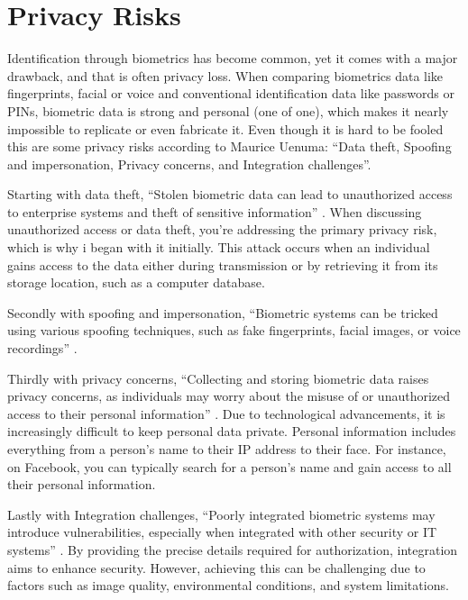 \documentclass[conference]{IEEEtran}
\begin{document}
\section{Privacy Risks}

Identification through biometrics has become common, yet it comes with a major drawback, and that is often privacy loss. When comparing biometrics data like fingerprints, facial or voice and conventional identification data like passwords or PINs, biometric data is strong and personal (one of one), which makes it nearly impossible to replicate or even fabricate it. Even though it is hard to be fooled this are some privacy risks according to Maurice Uenuma: ``Data theft, Spoofing and impersonation, Privacy concerns, and Integration challenges''. \cite{darkreading2024}

Starting with data theft, ``Stolen biometric data can lead to unauthorized access to enterprise systems and theft of sensitive information'' \cite{darkreading2024}. When discussing unauthorized access or data theft, you're addressing the primary privacy risk, which is why i began with it initially. This attack occurs when an individual gains access to the data either during transmission or by retrieving it from its storage location, such as a computer database.

Secondly with spoofing and impersonation, ``Biometric systems can be tricked using various spoofing techniques, such as fake fingerprints, facial images, or voice recordings'' \cite{darkreading2024}.

Thirdly with privacy concerns, ``Collecting and storing biometric data raises privacy concerns, as individuals may worry about the misuse of or unauthorized access to their personal information'' \cite{darkreading2024}. Due to technological advancements, it is increasingly difficult to keep personal data private.
Personal information includes everything from a person's name to their IP address to their face. For instance, on Facebook, you can typically search for a person's name and gain access to all their personal information.

Lastly with Integration challenges, ``Poorly integrated biometric systems may introduce vulnerabilities, especially when integrated with other security or IT systems'' \cite{darkreading2024}. By providing the precise details required for authorization, integration aims to enhance security. However, achieving this can be challenging due to factors such as image quality, environmental conditions, and system limitations.
\end{document}
